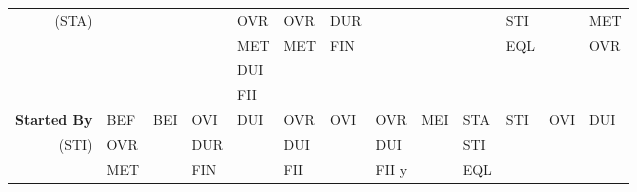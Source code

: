 \documentclass[11pt]{report}
\newenvironment{vvarmargin}[2]
{
  \begin{list}{}
  {
    \setlength{\topsep}{0pt}
    \setlength{\leftmargin}{0pt}
    \setlength{\rightmargin}{0pt}
    \setlength{\listparindent}{\parindent}
    \setlength{\itemindent}{\parindent}
    \setlength{\parsep}{0pt plus 1pt}
    \addtolength{\leftmargin}{#1}\addtolength{\rightmargin}{#2}
  }
  \item
}
{
  \end{list}
}
\begin{document}
\begin{table}[p]
\begin{vvarmargin}{-4cm}{-4cm}
\begin{center}
\begin{tabular}[t]{|r|l|l|l|l|l|l|l|l|l|l|l|l|}
                  (STA)                   &                         &                         &                         & OVR                     & OVR                     & DUR                     &                         &                         &                         & STI                     &                         & MET                     \\
                                          &                         &                         &                         & MET                     & MET                     & FIN                     &                         &                         &                         & EQL                     &                         & OVR                     \\
                                          &                         &                         &                         & DUI                     &                         &                         &                         &                         &                         &                         &                         &                         \\
                                          &                         &                         &                         & FII                     &                         &                         &                         &                         &                         &                         &                         &                         \\
                  \hline
                  \textbf{Started By}     & BEF                     & BEI                     & OVI                     & DUI                     & OVR                     & OVI                     & OVR                     & MEI                     & STA                     & STI                     & OVI                     & DUI                     \\
                  (STI)                   & OVR                     &                         & DUR                     &                         & DUI                     &                         & DUI                     &                         & STI                     &                         &                         &                         \\
                                          & MET                     &                         & FIN                     &                         & FII                     &                         & FII       y             &                         & EQL                     &                         &                         &                         \\

\end{tabular}
\end{center}
\end{vvarmargin}
\end{table}
\end{document}
